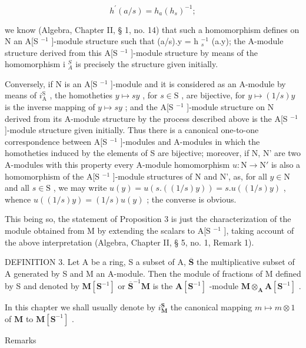 \[
h ^ {\prime} (a / s) = h _ {a} \left(h _ {s}\right) ^ {- 1};
\]

we know (Algebra, Chapter II, § 1, no. 14) that such a homomorphism defines on N an A{[}S \(^{-1}\) {]}-module structure such that (a/s).y = h \(_{s}^{-1}\) (a.y); the A-module structure derived from this A{[}S \(^{-1}\) {]}-module structure by means of the homomorphism i \(_{A}^{S}\) is precisely the structure given initially.

Conversely, if N is an A{[}S \(^{-1}\) {]}-module and it is considered as an A-module by means of \(i_{\text{A}}^{\text{S}}\) , the homotheties \(y \mapsto sy\) , for \(s \in \text{S}\) , are bijective, for \(y \mapsto (1/s)y\) is the inverse mapping of \(y \mapsto sy\) ; and the A{[}S \(^{-1}\) {]}-module structure on N derived from its A-module structure by the process described above is the A{[}S \(^{-1}\) {]}-module structure given initially. Thus there is a canonical one-to-one correspondence between A{[}S \(^{-1}\) {]}-modules and A-modules in which the homotheties induced by the elements of S are bijective; moreover, if N, N' are two A-modules with this property every A-module homomorphism \(u: \text{N} \to \text{N}'\) is also a homomorphism of the A{[}S \(^{-1}\) {]}-module structures of N and N', as, for all \(y \in \text{N}\) and all \(s \in \text{S}\) , we may write \(u(y) = u(s. ((1/s)y)) = s.u((1/s)y)\) , whence \(u((1/s)y) = (1/s)u(y)\) ; the converse is obvious.

This being so, the statement of Proposition 3 is just the characterization of the module obtained from M by extending the scalars to A{[}S \(^{-1}\) {]}, taking account of the above interpretation (Algebra, Chapter II, § 5, no. 1, Remark 1).

DEFINITION 3. Let A be a ring, S a subset of A, \(\overline{\mathbf{S}}\) the multiplicative subset of A generated by S and M an A-module. Then the module of fractions of M defined by S and denoted by \(\mathbf{M}[\mathbf{S}^{-1}]\) or \(\overline{\mathbf{S}}^{-1}\mathbf{M}\) is the \(\mathbf{A}[\mathbf{S}^{-1}]\) -module \(\mathbf{M} \otimes_{\mathbf{A}} \mathbf{A}[\mathbf{S}^{-1}]\) .

In this chapter we shall usually denote by \(i_{\mathbf{M}}^{\mathbf{S}}\) the canonical mapping \(m \mapsto m \otimes 1\) of \(\mathbf{M}\) to \(\mathbf{M}[\mathbf{S}^{-1}]\) .

Remarks

